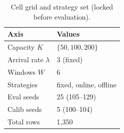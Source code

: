 \begin{table}[!t]
  \caption{Cell grid and strategy set (locked before evaluation).}
  \label{tab:grid}
  \centering
  \small
  \setlength{\tabcolsep}{4pt}
  \begin{tabular}{@{}p{2.8cm}p{4.7cm}@{}}
    \toprule
    \textbf{Axis} & \textbf{Values} \\
    \midrule
    Capacity $K$ & $\{50, 100, 200\}$ \\
    Arrival rate $\lambda$ & 3 (fixed) \\
    Windows $W$ & 6 \\
    Strategies & fixed, online, offline \\
    Eval seeds & 25 (105--129) \\
    Calib seeds & 5 (100--104) \\
    \midrule
    Total rows & 1{,}350 \\
    \bottomrule
  \end{tabular}
\end{table}
